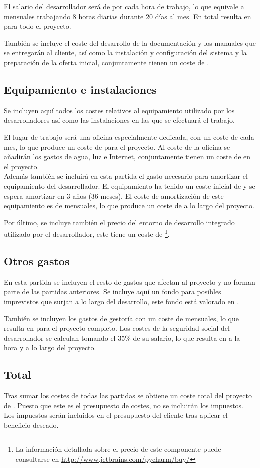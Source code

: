 	El salario del desarrollador será de   por cada hora de trabajo, lo que equivale a   mensuales trabajando 8 horas diarias durante 20 días al mes.  En total resulta en  para todo el proyecto.
	
	También se incluye el coste del desarrollo de la documentación y los manuales que se entregarán al cliente, así como la instalación y configuración del sistema y la preparación de la oferta inicial, conjuntamente tienen un coste de .

\subsection{Equipamiento e instalaciones}
	Se incluyen aquí todos los costes relativos al equipamiento utilizado por los desarrolladores así como las instalaciones en las que se efectuará el trabajo.
	
	El lugar de trabajo será una oficina especialmente dedicada, con un coste de  cada mes, lo que produce un coste de  para el proyecto.  Al coste de la oficina se añadirán los gastos de agua, luz e Internet, conjuntamente tienen un coste de  en el proyecto.\\
	Además también se incluirá en esta partida el gasto necesario para amortizar el equipamiento del desarrollador.  El equipamiento ha tenido un coste inicial de  y se espera amortizar en 3 años (36 meses).  El coste de amortización de este equipamiento es de  mensuales, lo que produce un coste de  a lo largo del proyecto.
	
	Por último, se incluye también el precio del entorno de desarrollo integrado utilizado por el desarrollador, este tiene un coste de \footnote{La información detallada sobre el precio de este componente puede consultarse en \url{http://www.jetbrains.com/pycharm/buy/}}.
	
\subsection{Otros gastos}
	En esta partida se incluyen el resto de gastos que afectan al proyecto y no forman parte de las partidas anteriores.  Se incluye aquí un fondo para posibles imprevistos que surjan a lo largo del desarrollo, este fondo está valorado en .
	
	También se incluyen los gastos de gestoría con un coste de  mensuales, lo que resulta en  para el proyecto completo.  Los costes de la seguridad social del desarrollador se calculan tomando el 35\% de su salario, lo que resulta en  a la hora y  a lo largo del proyecto.
	
\subsection{Total}
	Tras sumar los costes de todas las partidas se obtiene un coste total del proyecto de .  Puesto que este es el presupuesto de costes, no se incluirán los impuestos.  Los impuestos serán incluidos en el presupuesto del cliente tras aplicar el beneficio deseado.